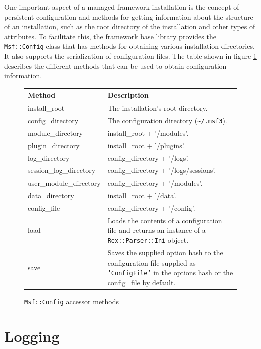 \documentclass{report}
\begin{document}
\par
One important aspect of a managed framework installation is the
concept of persistent configuration and methods for getting
information about the structure of an installation, such as the root
directory of the installation and other types of attributes.  To
facilitate this, the framework base library provides the
\texttt{Msf::Config} class that has methods for obtaining various
installation directories.  It also supports the serialization of
configuration files.  The table shown in figure
\ref{fig-table-config} describes the different methods that can be
used to obtain configuration information.


\begin{figure}[h]
\begin{center}
\begin{tabular}{|l|p{3.5in}|}
\hline
\textbf{Method} & \textbf{Description} \\
\hline
install\_root & The installation's root directory. \\
\hline
config\_directory & The configuration directory (\verb#~/.msf3#). \\
\hline
module\_directory & install\_root + '/modules'. \\
\hline
plugin\_directory & install\_root + '/plugins'. \\
\hline
log\_directory & config\_directory + '/logs'. \\
\hline
session\_log\_directory & config\_directory + '/logs/sessions'. \\
\hline
user\_module\_directory & config\_directory + '/modules'. \\
\hline
data\_directory & install\_root + '/data'. \\
\hline
config\_file & config\_directory + '/config'. \\
\hline
load & Loads the contents of a configuration file and returns an instance of a \texttt{Rex::Parser::Ini} object. \\
\hline
save & Saves the supplied option hash to the configuration file supplied as \texttt{'ConfigFile'} in the options hash or the config\_file by default. \\
\hline
\end{tabular}
\caption{\texttt{Msf::Config} accessor methods}
\label{fig-table-config}
\end{center}
\end{figure}

    \section{Logging}
\end{document}
